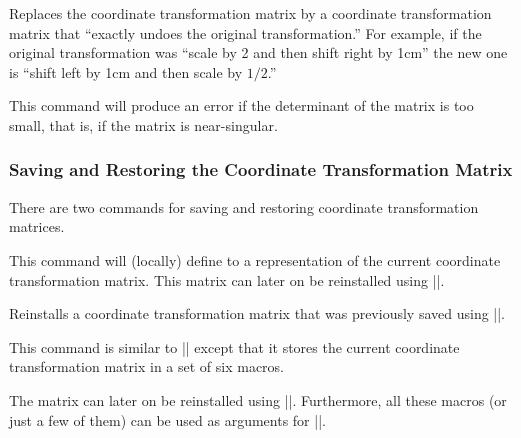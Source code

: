\begin{command}{\pgftransforminvert}
  Replaces the coordinate transformation matrix by a coordinate
  transformation matrix that ``exactly undoes the original
  transformation.'' For example, if the original transformation was
  ``scale by 2 and then shift right by 1cm'' the new one is ``shift
  left by 1cm and then scale by $1/2$.''

  This command will produce an error if the determinant of
  the matrix is too small, that is, if the matrix is near-singular.
\begin{codeexample}[]
\end{codeexample}
\end{command}

\subsubsection{Saving and Restoring the Coordinate Transformation
  Matrix}

There are two commands for saving and restoring coordinate
transformation matrices.

\begin{command}{\pgfgettransform{}}
  This command will (locally) define  to a representation
  of the current coordinate transformation matrix. This matrix can
  later on be reinstalled using |\pgfsettransform|.
\end{command}


\begin{command}{\pgfsettransform{}}
  Reinstalls a coordinate transformation matrix that was previously
  saved using |\pgfgettransform|.
\end{command}

\begin{command}{\pgfgettransformentries{}}
	This command is similar to |\pgfgettransform| except that it stores the current coordinate transformation matrix in a set of six macros.

	The matrix can later on be reinstalled using |\pgfsettransformentries|. Furthermore, all these macros (or just a few of them) can be used as arguments for |\pgftransformcm|.
\end{command}

